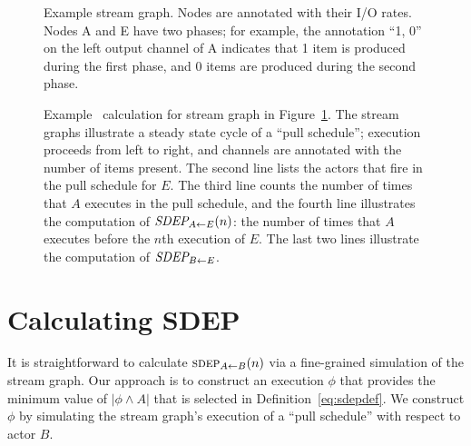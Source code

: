 \begin{figure}[t]
\begin{center}
\caption{{\small Example stream graph. Nodes are annotated with their
I/O rates. Nodes A and E have two phases; for example, the annotation
``1, 0'' on the left output channel of A indicates that 1 item is
produced during the first phase, and 0 items are produced during the second phase.
\protect\label{fig:sdep-rates}}}
\end{center}
\vspace{-12pt}
\end{figure}

\begin{figure*}[t]
\begin{center}
\caption{\small Example \figsdep\ calculation for stream graph in
Figure~\ref{fig:sdep-rates}.  The stream graphs illustrate a steady
state cycle of a ``pull schedule''; execution proceeds from left to
right, and channels are annotated with the number of items present.
The second line lists the actors that fire in the pull schedule for
$E$.  The third line counts the number of times that $A$ executes in
the pull schedule, and the fourth line illustrates the computation of
$\figsdepf{A}{E}(n)$: the number of times that $A$ executes before the
$n$th execution of $E$.  The last two lines illustrate the computation
of $\figsdepf{B}{E}$.
\protect\label{fig:sdep1}}
\end{center}
\vspace{-12pt}
\end{figure*}

\section{Calculating SDEP}
\label{sec:calc-sdep}

It is straightforward to calculate $\sdepf{A}{B}(n)$ via a
fine-grained simulation of the stream graph.  Our approach is to
construct an execution $\phi$ that provides the minimum value of
$|\phi \wedge A|$ that is selected in Definition~\ref{eq:sdepdef}.  We
construct $\phi$ by simulating the stream graph's execution of a
``pull schedule'' with respect to actor $B$.

